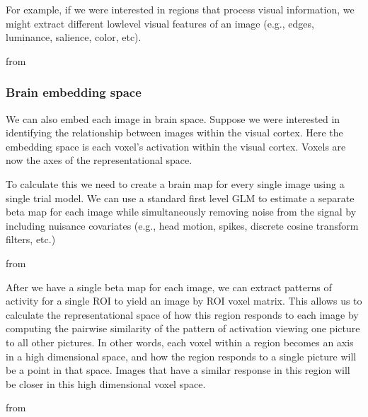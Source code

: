 \documentclass[letterpaper,10pt,english]{sphinxmanual}
\begin{document}
For example, if we were interested in regions that process visual information, we might extract different low\sphinxhyphen{}level visual features of an image (e.g., edges, luminance, salience, color, etc).

from 


\subsubsection{Brain embedding space}
\label{\detokenize{content/RSA:brain-embedding-space}}
We can also embed each image in brain space. Suppose we were interested in identifying the relationship between images within the visual cortex. Here the embedding space is each voxel’s activation within the visual cortex. Voxels are now the axes of the representational space.

To calculate this we need to create a brain map for every single image using a single trial model. We can use a standard first level GLM to estimate a separate beta map for each image while simultaneously removing noise from the signal by including nuisance covariates (e.g., head motion, spikes, discrete cosine transform filters, etc.)

from 

After we have a single beta map for each image, we can extract patterns of activity for a single ROI to yield an image by ROI voxel matrix. This allows us to calculate the representational space of how this region responds to each image by computing the pairwise similarity of the pattern of activation viewing one picture to all other pictures. In other words, each voxel within a region becomes an axis in a high dimensional space, and how the region responds to a single picture will be a point in that space. Images that have a similar response in this region will be closer in this high dimensional voxel space.

from 
\end{document}
